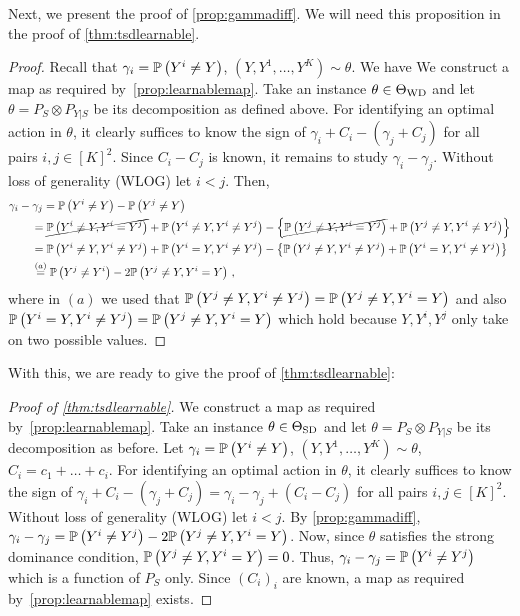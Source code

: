 Next, we present the proof of \cref{prop:gammadiff}. We will need this proposition in the proof of 
\cref{thm:tsdlearnable}.
\propGammadiff*
\begin{proof}
Recall that $\gamma_i = \mathbb{P}\left(Y^i \ne Y\right)$, $(Y,Y^1,\dots,Y^K)\sim \theta$. We have
	We construct a map as required by~\cref{prop:learnablemap}.
	Take an instance $\theta \in \Theta_{\mathrm{WD}}$ and let $\theta = P_S \otimes P_{Y|S}$ be its decomposition
	as defined above.
	For identifying an optimal action in $\theta$, it clearly suffices
	to know the sign of $\gamma_i + C_i - (\gamma_j +C_j)$ for all pairs $i,j\in [K]^2$.
	Since $C_i - C_j$ is known, it remains to study $\gamma_i-\gamma_j$.
	Without loss of generality (WLOG) let $i<j$.
	Then, 
\fi	
	\begin{align*}
	\MoveEqLeft 
	\gamma_i  - \gamma_j = \Prob{Y^i\ne Y} - \Prob{Y^j\ne Y} \\
	& = \cancel{\Prob{Y^i\ne Y, Y^i=Y^j}} + \Prob{ Y^i\ne Y, Y^i\ne Y^j } 
	 - \left\{ 
	\cancel{\Prob{Y^j\ne Y, Y^i=Y^j}} + \Prob{ Y^j\ne Y, Y^i\ne Y^j }\right\}\\
	& = \Prob{ Y^i\ne Y, Y^i \ne Y^j } + \Prob{Y^i=Y,Y^i\ne Y^j}       
	 - \left\{ 
	\Prob{ Y^j \ne Y, Y^i\ne Y^j } + \Prob{ Y^i=Y,Y^i\ne Y^j}
	\right\}\\
	& \stackrel{\footnotesize (a)}{=} \Prob{ Y^j \ne Y^i } -2 \Prob{ Y^j\ne Y, Y^i = Y }\,,
	\end{align*}
	where in $(a)$ we used that $\mathbb{P}\left( Y^j \ne Y, Y^i\ne Y^j \right) =  \mathbb{P}\left( Y^j\ne Y,Y^i= Y\right)$ and also
	$\mathbb{P}\left( Y^i=Y,Y^i\ne Y^j\right) = \mathbb{P}\left( Y^j\ne Y,Y^i= Y\right)$
	which hold because $Y,Y^i,Y^j$ only take on two possible values.
\end{proof}



With this, we are ready to give the proof of \cref{thm:tsdlearnable}:
\thmTSDLearnable*
\begin{proof}[Proof of \cref{thm:tsdlearnable}]
	We construct a map as required by~\cref{prop:learnablemap}.
	Take an instance $\theta \in \Theta_{\mathrm{SD}}$ and let $\theta = P_S \otimes P_{Y|S}$ be its decomposition as before.
	Let $\gamma_i = \mathbb{P}\left(Y^i \ne Y\right)$, $(Y,Y^1,\dots,Y^K)\sim \theta$, $C_i = c_1+\dots+c_i$.
	For identifying an optimal action in $\theta$, it clearly suffices
	to know the sign of $\gamma_i + C_i - (\gamma_j +C_j) = \gamma_i-\gamma_j + (C_i-C_j)$ for all pairs $i,j\in [K]^2$.
	Without loss of generality (WLOG) let $i<j$. By \cref{prop:gammadiff},
	$\gamma_i - \gamma_j = \mathbb{P}\left( Y^i \ne Y^j \right) -2 \mathbb{P}\left( Y^j\ne Y, Y^i = Y \right)$.
	Now, since $\theta$ satisfies the strong dominance condition, $ \mathbb{P}\left( Y^j\ne Y, Y^i = Y \right) = 0$.
	Thus, $\gamma_i - \gamma_j = \mathbb{P}\left( Y^i \ne Y^j \right)$
	which is a function of $P_S$ only.
	Since $(C_i)_i$ are known, a map as required by~\cref{prop:learnablemap} exists.
\end{proof}

